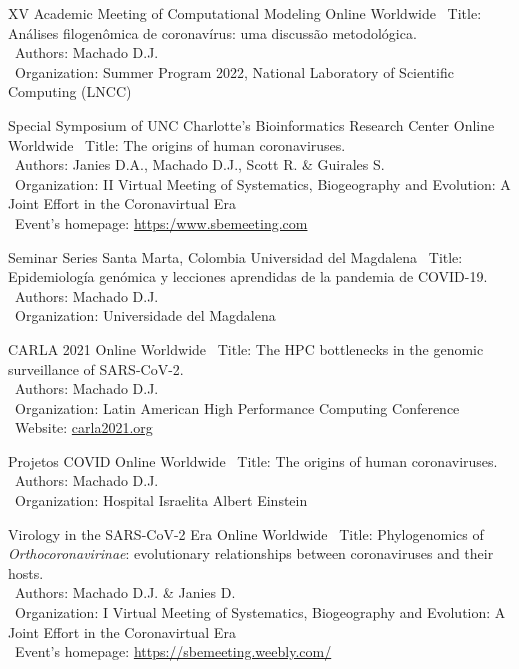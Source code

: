 \documentclass[11pt, letterpaper, sans]{moderncv}
\begin{document}
\cventry{---}
	{XV Academic Meeting of Computational Modeling}
	{Online}
	{Worldwide}
	{}
	{
		\textbullet~Title: Análises filogenômica de coronavírus: uma discussão metodológica.\\
		\textbullet~Authors: Machado D.J.\\
		\textbullet~Organization: Summer Program 2022, National Laboratory of Scientific Computing (LNCC)\\
	}

	{Special Symposium of UNC Charlotte's Bioinformatics Research Center}
	{Online}
	{Worldwide}
	{}
	{
		\textbullet~Title: The origins of human coronaviruses.\\
		\textbullet~Authors: Janies D.A., Machado D.J., Scott R. \& Guirales S.\\
		\textbullet~Organization: II Virtual Meeting of Systematics, Biogeography and Evolution: A Joint Effort in the Coronavirtual Era\\
		\textbullet~Event's homepage: \url{https:/www.sbemeeting.com}
	}

\cventry{---}
	{Seminar Series}
	{Santa Marta, Colombia}
	{Universidad del Magdalena}
	{}
	{
		\textbullet~Title: Epidemiología genómica y lecciones aprendidas de la pandemia de COVID-19.\\
		\textbullet~Authors: Machado D.J.\\
		\textbullet~Organization: Universidade del Magdalena\\
	}

\cventry{---}
	{CARLA 2021}
	{Online}
	{Worldwide}
	{}
	{
		\textbullet~Title: The HPC bottlenecks in the genomic surveillance of SARS-CoV-2.\\
		\textbullet~Authors: Machado D.J.\\
		\textbullet~Organization: Latin American High Performance Computing Conference\\
		\textbullet~Website: \url{carla2021.org}\\
	}

\cventry{---}
	{Projetos COVID}
	{Online}
	{Worldwide}
	{}
	{
		\textbullet~Title: The origins of human coronaviruses.\\
		\textbullet~Authors: Machado D.J.\\
		\textbullet~Organization: Hospital Israelita Albert Einstein\\
	}

	{Virology in the SARS-CoV-2 Era}
	{Online}
	{Worldwide}
	{}
	{
		\textbullet~Title: Phylogenomics of \textit{Orthocoronavirinae}: evolutionary relationships between coronaviruses and their hosts.\\
		\textbullet~Authors: Machado D.J. \& Janies D.\\
		\textbullet~Organization: I Virtual Meeting of Systematics, Biogeography and Evolution: A Joint Effort in the Coronavirtual Era\\
		\textbullet~Event's homepage: \url{https://sbemeeting.weebly.com/}
	}
\end{document}
